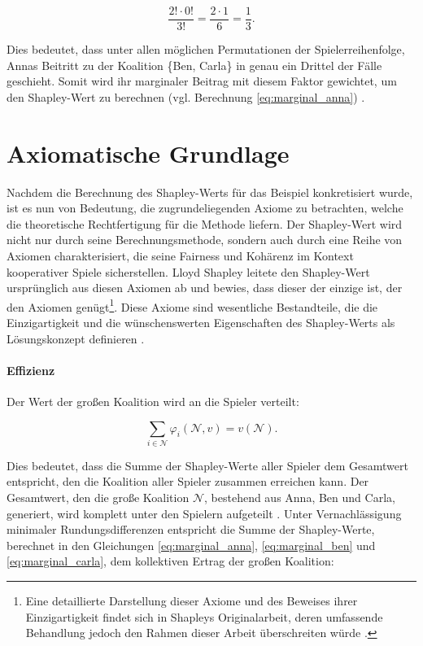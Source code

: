 \begin{equation}
\frac{2! \cdot 0!}{3!} = \frac{2 \cdot 1}{6} = \frac{1}{3}.
\end{equation}

Dies bedeutet, dass unter allen möglichen Permutationen der Spielerreihenfolge, Annas Beitritt zu der Koalition \{Ben, Carla\} 
in genau ein Drittel der Fälle geschieht. Somit wird ihr marginaler Beitrag mit diesem Faktor gewichtet, 
um den Shapley-Wert zu berechnen (vgl. Berechnung \ref{eq:marginal_anna}) \cite[S. 21f]{Molnar_2023}.


\section{Axiomatische Grundlage}
\label{sec:axiome-shapley}

Nachdem die Berechnung des Shapley-Werts für das Beispiel konkretisiert wurde, ist es nun von Bedeutung, die zugrundeliegenden Axiome zu betrachten, 
welche die theoretische Rechtfertigung für die Methode liefern. Der Shapley-Wert wird nicht nur durch seine Berechnungsmethode, 
sondern auch durch eine Reihe von Axiomen charakterisiert, die seine Fairness und Kohärenz im Kontext kooperativer Spiele sicherstellen. 
Lloyd Shapley leitete den Shapley-Wert ursprünglich aus diesen Axiomen ab und bewies, 
dass dieser der einzige ist, der den Axiomen genügt\footnote{Eine detaillierte Darstellung dieser Axiome und des Beweises 
ihrer Einzigartigkeit findet sich in Shapleys Originalarbeit, deren umfassende Behandlung jedoch den Rahmen dieser Arbeit überschreiten würde \cite[S. 307-318]{Shapley+1953+307+318}.}. 
Diese Axiome sind wesentliche Bestandteile, die die Einzigartigkeit und die wünschenswerten Eigenschaften des Shapley-Werts als Lösungskonzept definieren \cite[S. 22]{Molnar_2023}. 

\paragraph{\rmfamily\bfseries Effizienz}

Der Wert der großen Koalition wird an die Spieler verteilt:

\begin{equation}
\sum_{i \in \mathcal{N}} \varphi_i (\mathcal{N}, v) = v(\mathcal{N}).
\end{equation}

Dies bedeutet, dass die Summe der Shapley-Werte aller Spieler dem Gesamtwert entspricht, 
den die Koalition aller Spieler zusammen erreichen kann. Der Gesamtwert, den die große Koalition $\mathcal{N}$, 
bestehend aus Anna, Ben und Carla, generiert, wird komplett unter den Spielern aufgeteilt \cite[S. 22]{Molnar_2023}. 
Unter Vernachlässigung minimaler Rundungsdifferenzen entspricht die Summe der Shapley-Werte, 
berechnet in den Gleichungen \ref{eq:marginal_anna}, \ref{eq:marginal_ben} und \ref{eq:marginal_carla}, 
dem kollektiven Ertrag der großen Koalition:

